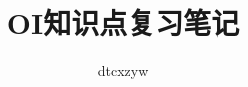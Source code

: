\documentclass{book}
\begin{document}
\title{OI知识点复习笔记}
\author{dtcxzyw}
\maketitle
\tableofcontents
\mainmatter{}

\appendix
\backmatter{}
\end{document}
